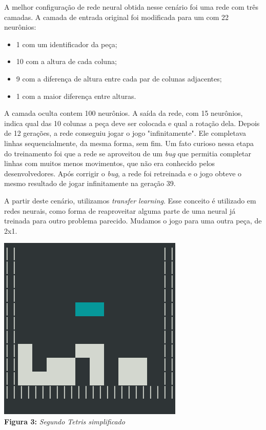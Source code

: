 \documentclass[conference]{IEEEtran}
\begin{document}
A melhor configuração de rede neural obtida nesse cenário foi uma rede com três camadas. A camada de entrada original foi modificada para um com 22 neurônios: 

\begin{itemize}
\item 1 com um identificador da peça;
\item 10 com a altura de cada coluna;
\item 9 com a diferença de altura entre cada par de colunas adjacentes;
\item 1 com a maior diferença entre alturas.
\end{itemize}

A camada oculta contem 100 neurônios. A saída da rede, com 15 neurônios, indica qual das 10 colunas a peça deve ser colocada e qual a rotação dela. Depois de 12 gerações, a rede conseguiu jogar o jogo "infinitamente". Ele completava linhas sequencialmente, da mesma forma, sem fim. Um fato curioso nessa etapa do treinamento foi que a rede se aproveitou de um \textit{bug} que permitia completar linhas com muitos menos movimentos, que não era conhecido pelos desenvolvedores. Após corrigir o \textit{bug}, a rede foi retreinada e o jogo obteve o mesmo resultado de jogar infinitamente na geração 39.

A partir deste cenário, utilizamos \textit{transfer learning}. Esse conceito é utilizado em redes neurais, como forma de reaproveitar alguma parte de uma neural já treinada para outro problema parecido. Mudamos o jogo para uma outra peça, de 2x1.

\begin{center}
\includegraphics[scale=0.3]{tetris_simples2.png}\\

\textbf{Figura 3:} \textit{Segundo Tetris simplificado}
\end{center}
\end{document}
